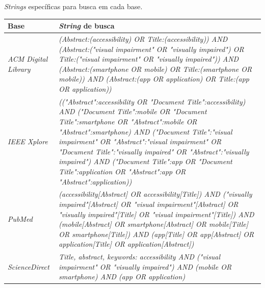 \begin{quadro}[htb]
  \caption{\label{qua-str-esp}\emph{Strings} específicas para busca em cada base.}
  \begin{tabular}{|m{3.5cm} | m{11.5cm}|}
    \hline
    \textbf{Base}              & \textbf{\emph{String} de busca}                                                                                                                                                                                                                                                                                                                                                                                                                \\ \hline
    \emph{ACM Digital Library} & \emph{(Abstract:(accessibility) OR Title:(accessibility)) AND (Abstract:("visual impairment" OR "visually impaired") OR Title:("visual impairment" OR "visually impaired")) AND (Abstract:(smartphone OR mobile) OR Title:(smartphone OR mobile)) AND (Abstract:(app OR application) OR Title:(app OR application))}                                                                                                                           \\ \hline
    \emph{IEEE Xplore}         & \emph{(("Abstract":accessibility OR "Document Title":accessibility) AND ("Document Title":mobile OR "Document Title":smartphone OR "Abstract":mobile OR "Abstract":smartphone) AND ("Document Title":"visual impairment" OR "Abstract":"visual impairment" OR "Document Title":"visually impaired" OR "Abstract":"visually impaired") AND ("Document Title":app OR "Document Title":application OR "Abstract":app OR "Abstract":application))} \\ \hline
    \emph{PubMed}              & \emph{(accessibility[Abstract] OR accessibility[Title]) AND ("visually impaired"[Abstract] OR "visual impairment"[Abstract] OR "visually impaired"[Title] OR "visual impairment"[Title]) AND (mobile[Abstract] OR smartphone[Abstract] OR mobile[Title] OR smartphone[Title]) AND (app[Title] OR app[Abstract] OR application[Title] OR application[Abstract])}                                                                                \\ \hline
    \emph{ScienceDirect}       & \emph{Title, abstract, keywords: accessibility AND ("visual impairment" OR "visually impaired") AND (mobile OR smartphone) AND (app OR application)}                                                                                                                                                                                                                                                                                           \\ \hline

\end{tabular}
\end{quadro}
